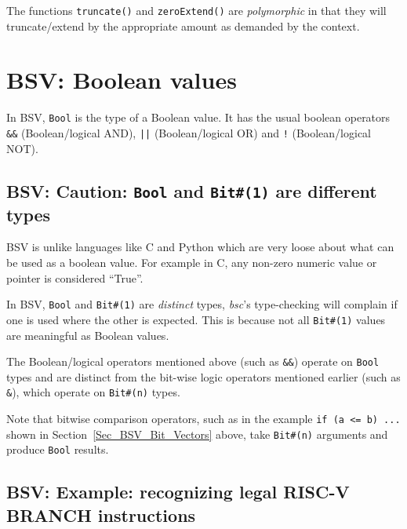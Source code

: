 The functions \verb|truncate()| and \verb|zeroExtend()| are
\emph{polymorphic} in that they will truncate/extend by the
appropriate amount as demanded by the context.


\section{BSV: Boolean values}

\label{Sec_BSV_Boolean_values}


In BSV, \verb|Bool| is the type of a Boolean value. It has the usual
boolean operators \verb|&&| (Boolean/logical AND), \verb'||'
(Boolean/logical OR) and \verb|!| (Boolean/logical NOT).


\subsection{BSV: Caution: {\tt Bool} and {\tt Bit\#(1)} are different types}

BSV is unlike languages like C and Python which are very loose about
what can be used as a boolean value.  For example in C, any non-zero
numeric value or pointer is considered ``True''.

In BSV, \verb|Bool| and \verb|Bit#(1)| are \emph{distinct} types,
{\ie} \emph{bsc}'s type-checking will complain if one is used where
the other is expected.  This is because not all \verb|Bit#(1)| values
are meaningful as Boolean values.

The Boolean/logical operators mentioned above (such as \verb|&&|)
operate on \verb|Bool| types and are distinct from the bit-wise logic
operators mentioned earlier (such as \verb|&|), which operate on
\verb|Bit#(n)| types.

Note that bitwise comparison operators, such as in the example
\verb|if (a <= b) ...| shown in Section~\ref{Sec_BSV_Bit_Vectors}
above, take \verb|Bit#(n)| arguments and produce \verb|Bool| results.


\subsection{BSV: Example: recognizing legal RISC-V BRANCH instructions}

